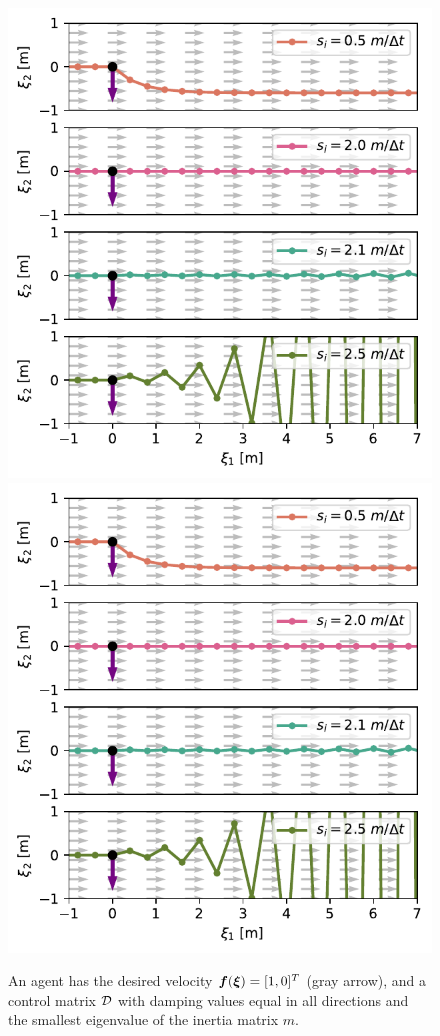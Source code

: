 \begin{figure}[htbp]
\centering
\ifthesis
  \includegraphics[width=0.7\columnwidth]{figures/discrete_controller_parameters_comparison}
  \else
  \includegraphics[width=\columnwidth]{figures/discrete_controller_parameters_comparison}
  \fi
  \caption{An agent has the desired velocity $\boldsymbol{f}(\boldsymbol{\xi}) = [1, 0]^T$ (gray arrow), and a control matrix $\mathcal{D}$ with damping values equal in all directions and the smallest eigenvalue of the inertia matrix $m$. 
}
\end{figure}
